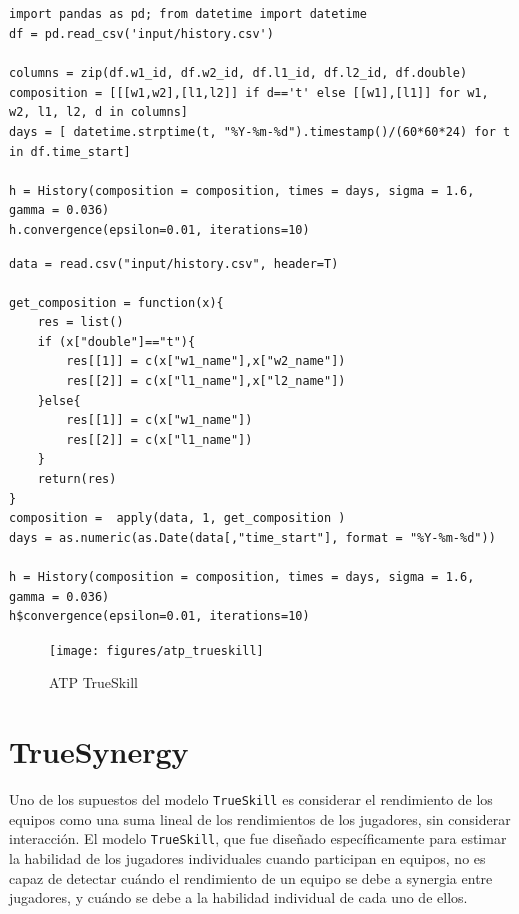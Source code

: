 \documentclass[a4paper,11pt]{book}
\theoremstyle{definition}
\newif\ifen
\newif\ifes
\newcommand{\en}[1]{\ifen#1\fi}
\newcommand{\es}[1]{\ifes#1\fi}
\begin{document}
\subsection{\en{The history of the Association of Tennis Professionals (ATP)}} \label{sec:appendix_atp_code}
%
\begin{lstlisting}[backgroundcolor=\color{python!60},caption={\en{\texttt{Python} code}\es{Código \texttt{Python}}},aboveskip=0.0 \baselineskip, belowskip=0.1cm]
import pandas as pd; from datetime import datetime
df = pd.read_csv('input/history.csv')

columns = zip(df.w1_id, df.w2_id, df.l1_id, df.l2_id, df.double)
composition = [[[w1,w2],[l1,l2]] if d=='t' else [[w1],[l1]] for w1, w2, l1, l2, d in columns]
days = [ datetime.strptime(t, "%Y-%m-%d").timestamp()/(60*60*24) for t in df.time_start]

h = History(composition = composition, times = days, sigma = 1.6, gamma = 0.036)
h.convergence(epsilon=0.01, iterations=10)
\end{lstlisting}
%
\begin{lstlisting}[backgroundcolor=\color{r!50},caption={\en{\texttt{R} code}\es{Código \texttt{R}}},aboveskip=0.0 \baselineskip, belowskip=0.1cm]
data = read.csv("input/history.csv", header=T)

get_composition = function(x){
    res = list()
    if (x["double"]=="t"){
        res[[1]] = c(x["w1_name"],x["w2_name"])
        res[[2]] = c(x["l1_name"],x["l2_name"])
    }else{
        res[[1]] = c(x["w1_name"])
        res[[2]] = c(x["l1_name"])
    }
    return(res)
}
composition =  apply(data, 1, get_composition )
days = as.numeric(as.Date(data[,"time_start"], format = "%Y-%m-%d"))

h = History(composition = composition, times = days, sigma = 1.6, gamma = 0.036)
h$convergence(epsilon=0.01, iterations=10)
\end{lstlisting}

\begin{figure}[ht!]
 \centering
  \texttt{[image: figures/atp\_trueskill]}
  \caption{ATP TrueSkill}
  \label{atp_trueskill}
\end{figure}


\section{TrueSynergy} \label{sec:TrueSynergy}

Uno de los supuestos del modelo \texttt{TrueSkill} es considerar el rendimiento de los equipos como una suma lineal de los rendimientos de los jugadores, sin considerar interacci\'on.
%
El modelo \texttt{TrueSkill}, que fue diseñado específicamente para estimar la habilidad de los jugadores individuales cuando participan en equipos, no es capaz de detectar cu\'ando el rendimiento de un equipo se debe a synergia entre jugadores, y cu\'ando se debe a la habilidad individual de cada uno de ellos.
\end{document}
